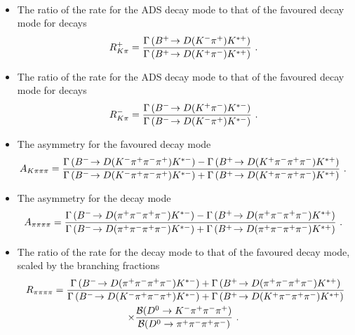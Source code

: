 \begin{itemize}
{\begin{multline}
\label{eqn:Rpipi}
\end{multline}}
\item{The ratio of the rate for the ADS decay mode to that of the favoured decay mode for \Bp decays
\begin{equation}
R^+_{K\pi} = \frac{\Gamma\left({{{B}^+}}\!\rightarrow {\ensuremath{D}}({{K}^-}{{\pi}^+}){{K}^{*+}}\right)}{\Gamma\left({{{B}^+}}\!\rightarrow {\ensuremath{D}}({{K}^+}{{\pi}^-}){{K}^{*+}}\right)} \text{ . }
\label{eqn:Rplus}
\end{equation}
}
\item{The ratio of the rate for the ADS decay mode to that of the favoured decay mode for \Bm decays
\begin{equation}
R^-_{K\pi} = \frac{\Gamma\left({{{B}^-}}\!\rightarrow {\ensuremath{D}}({{K}^+}{{\pi}^-}){{K}^{*-}}\right)}{\Gamma\left({{{B}^-}}\!\rightarrow {\ensuremath{D}}({{K}^-}{{\pi}^+}){{K}^{*-}}\right)} \text{ . }
\label{eqn:Rminus}
\end{equation}
}
\item{The \CP asymmetry for the favoured \decay{\Dz}{\Km\pip\pim\pip} decay mode
{\footnotesize
\begin{equation}
A_{{K}\pi\pi\pi} = \frac{\Gamma\left({{{B}^-}}\!\rightarrow {\ensuremath{D}}({{K}^-}{{\pi}^+}{{\pi}^-}{{\pi}^+}){{K}^{*-}}\right) - \Gamma\left({{{B}^+}}\!\rightarrow {\ensuremath{D}}({{K}^+}{{\pi}^-}{{\pi}^+}{{\pi}^-}){{K}^{*+}}\right)}{\Gamma\left({{{B}^-}}\!\rightarrow {\ensuremath{D}}({{K}^-}{{\pi}^+}{{\pi}^-}{{\pi}^+}){{K}^{*-}}\right) + \Gamma\left({{{B}^+}}\!\rightarrow {\ensuremath{D}}({{K}^+}{{\pi}^-}{{\pi}^+}{{\pi}^-}){{K}^{*+}}\right)} \text{ . }
\label{eqn:Akpipipi}
\end{equation}}}
\item{The \CP asymmetry for the \decay{\D}{\pip\pim\pip\pim} decay mode
{\footnotesize
\begin{equation}
A_{\pi\pi\pi\pi} = \frac{\Gamma\left({{{B}^-}}\!\rightarrow {\ensuremath{D}}({{\pi}^+}{{\pi}^-}{{\pi}^+}{{\pi}^-}){{K}^{*-}}\right) - \Gamma\left({{{B}^+}}\!\rightarrow {\ensuremath{D}}({{\pi}^+}{{\pi}^-}{{\pi}^+}{{\pi}^-}){{K}^{*+}}\right)}{\Gamma\left({{{B}^-}}\!\rightarrow {\ensuremath{D}}({{\pi}^+}{{\pi}^-}{{\pi}^+}{{\pi}^-}){{K}^{*-}}\right) + \Gamma\left({{{B}^+}}\!\rightarrow {\ensuremath{D}}({{\pi}^+}{{\pi}^-}{{\pi}^+}{{\pi}^-}){{K}^{*+}}\right)} \text{ . }
\label{eqn:Apipipipi}
\end{equation}
}}
\item{The ratio of the rate for the \decay{\D}{\pip\pim\pip\pim} decay mode to that of the favoured decay mode, scaled by the branching fractions
{\footnotesize
\begin{multline}
R_{\pi\pi\pi\pi} = \frac{\Gamma\left(\decay{\Bm}{\D(\pip\pim\pip\pim)\Kstarm}\right) + \Gamma\left(\decay{\Bp}{\D(\pip\pim\pip\pim)\Kstarp}\right)}{\Gamma\left(\decay{\Bm}{\D(\Km\pip\pim\pip)\Kstarm}\right) + \Gamma\left(\decay{\Bp}{\D(\Kp\pim\pip\pim)\Kstarp}\right)} \\
\times \frac{\mathcal{B}(D^0 \to \Km\pip\pim\pip)}{\mathcal{B}(D^0 \to \pip\pim\pip\pim)} \text{ . }

\end{multline}}}
\end{itemize}
